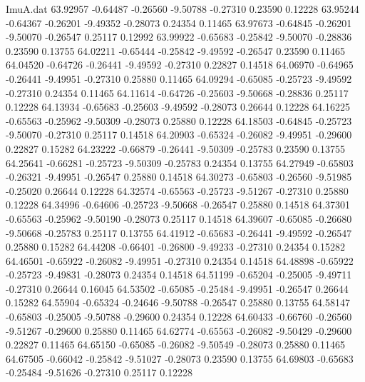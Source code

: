 \begin{filecontents}{ImuA.dat}
  63.92957   -0.64487   -0.26560   -9.50788   -0.27310    0.23590    0.12228
  63.95244   -0.64367   -0.26201   -9.49352   -0.28073    0.24354    0.11465
  63.97673   -0.64845   -0.26201   -9.50070   -0.26547    0.25117    0.12992
  63.99922   -0.65683   -0.25842   -9.50070   -0.28836    0.23590    0.13755
  64.02211   -0.65444   -0.25842   -9.49592   -0.26547    0.23590    0.11465
  64.04520   -0.64726   -0.26441   -9.49592   -0.27310    0.22827    0.14518
  64.06970   -0.64965   -0.26441   -9.49951   -0.27310    0.25880    0.11465
  64.09294   -0.65085   -0.25723   -9.49592   -0.27310    0.24354    0.11465
  64.11614   -0.64726   -0.25603   -9.50668   -0.28836    0.25117    0.12228
  64.13934   -0.65683   -0.25603   -9.49592   -0.28073    0.26644    0.12228
  64.16225   -0.65563   -0.25962   -9.50309   -0.28073    0.25880    0.12228
  64.18503   -0.64845   -0.25723   -9.50070   -0.27310    0.25117    0.14518
  64.20903   -0.65324   -0.26082   -9.49951   -0.29600    0.22827    0.15282
  64.23222   -0.66879   -0.26441   -9.50309   -0.25783    0.23590    0.13755
  64.25641   -0.66281   -0.25723   -9.50309   -0.25783    0.24354    0.13755
  64.27949   -0.65803   -0.26321   -9.49951   -0.26547    0.25880    0.14518
  64.30273   -0.65803   -0.26560   -9.51985   -0.25020    0.26644    0.12228
  64.32574   -0.65563   -0.25723   -9.51267   -0.27310    0.25880    0.12228
  64.34996   -0.64606   -0.25723   -9.50668   -0.26547    0.25880    0.14518
  64.37301   -0.65563   -0.25962   -9.50190   -0.28073    0.25117    0.14518
  64.39607   -0.65085   -0.26680   -9.50668   -0.25783    0.25117    0.13755
  64.41912   -0.65683   -0.26441   -9.49592   -0.26547    0.25880    0.15282
  64.44208   -0.66401   -0.26800   -9.49233   -0.27310    0.24354    0.15282
  64.46501   -0.65922   -0.26082   -9.49951   -0.27310    0.24354    0.14518
  64.48898   -0.65922   -0.25723   -9.49831   -0.28073    0.24354    0.14518
  64.51199   -0.65204   -0.25005   -9.49711   -0.27310    0.26644    0.16045
  64.53502   -0.65085   -0.25484   -9.49951   -0.26547    0.26644    0.15282
  64.55904   -0.65324   -0.24646   -9.50788   -0.26547    0.25880    0.13755
  64.58147   -0.65803   -0.25005   -9.50788   -0.29600    0.24354    0.12228
  64.60433   -0.66760   -0.26560   -9.51267   -0.29600    0.25880    0.11465
  64.62774   -0.65563   -0.26082   -9.50429   -0.29600    0.22827    0.11465
  64.65150   -0.65085   -0.26082   -9.50549   -0.28073    0.25880    0.11465
  64.67505   -0.66042   -0.25842   -9.51027   -0.28073    0.23590    0.13755
  64.69803   -0.65683   -0.25484   -9.51626   -0.27310    0.25117    0.12228

\end{filecontents}
